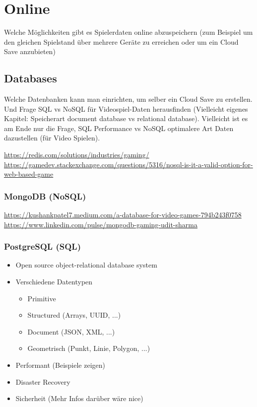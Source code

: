 \chapter{Online}\label{ch:online}
Welche Möglichkeiten gibt es Spielerdaten online abzuspeichern (zum Beispiel um den gleichen Spielstand über mehrere Geräte zu erreichen oder um ein Cloud Save anzubieten)

\section{Databases}
Welche Datenbanken kann man einrichten, um selber ein Cloud Save zu erstellen. Und Frage SQL vs NoSQL für Videospiel-Daten herausfinden (Vielleicht eigenes Kapitel: Speicherart document database vs relational database). Vielleicht ist es am Ende nur die Frage, SQL Performance vs NoSQL optimalere Art Daten dazustellen (für Video Spielen).

\url{https://redis.com/solutions/industries/gaming/}\\
\url{https://gamedev.stackexchange.com/questions/5316/nosql-is-it-a-valid-option-for-web-based-game}

\subsection{MongoDB (NoSQL)}

\url{https://kushankpatel7.medium.com/a-database-for-video-games-794b243f0758}\\
\url{https://www.linkedin.com/pulse/mongodb-gaming-udit-sharma}

\subsection{PostgreSQL (SQL)}
\begin{itemize}
    \item Open source object-relational database system
    \item Verschiedene Datentypen
    \begin{itemize}
        \item Primitive
        \item Structured (Arrays, UUID, ...)
        \item Document (JSON, XML, ...)
        \item Geometrisch (Punkt, Linie, Polygon, ...)
    \end{itemize}
    \item Performant (Beispiele zeigen)
    \item Disaster Recovery
    \item Sicherheit (Mehr Infos darüber wäre nice)
\end{itemize}


